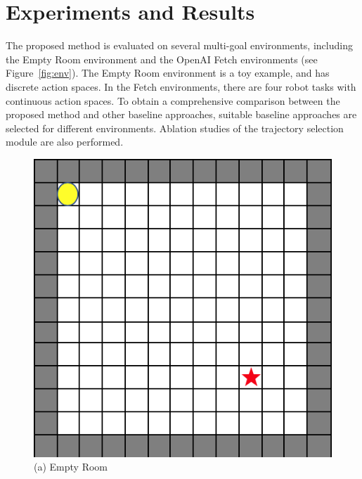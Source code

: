 \section{Experiments and Results}
\label{sec:experiment}
The proposed method is evaluated on several multi-goal environments, including the Empty Room environment and the OpenAI Fetch environments (see Figure~\ref{fig:env}). The Empty Room environment is a toy example, and has discrete action spaces. In the Fetch environments, there are four robot tasks with continuous action spaces. To obtain a comprehensive comparison between the proposed method and other baseline approaches, suitable baseline approaches are selected for different environments. Ablation studies of the trajectory selection module are also performed.
\begin{figure}[t]
  \centering
  \includegraphics[width=\linewidth]{figures/chapter3/empty_room.png}
  ({a}) Empty Room \hspace{3em}          
\endminipage\hfill
{}
  \centering

\end{figure}
